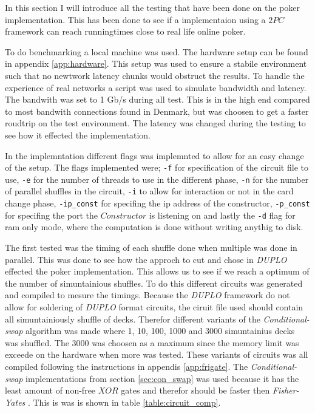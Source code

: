 \documentclass[twoside,11pt,openright]{report}
\newcommand{\FY}{\textit{Fisher-Yates} }
\newcommand{\CS}{\textit{Conditional-swap} }
\newcommand{\DUPLO}{\textit{DUPLO} }
\begin{document}
In this section I will introduce all the testing that have been done on the poker implementation. This has been done to see if a implementaion using a $2PC$ framework can reach runningtimes close to real life online poker.

To do benchmarking a local machine was used. The hardware setup can be found in appendix \ref{app:hardware}. This setup was used to ensure a stabile environment such that no newtwork latency chunks would obstruct the results. To handle the experience of real networks a script was used to simulate bandwidth and latency. The bandwith was set to 1 Gb/s during all test. This is in the high end compared to most bandwith connections found in Denmark, but was choosen to get a faster roudtrip on the test environment. The latency was changed during the testing to see how it effected the implementation.

In the implemntation different flags was implemnted to allow for an easy change of the setup. The flags implemented were; \verb|-f| for specification of the circuit file to use, \verb|-e| for the number of threads to use in the different phase, \verb|-n| for the number of parallel shuffles in the circuit, \verb|-i| to allow for interaction or not in the card change phase, \verb|-ip_const| for specifing the ip address of the constructor, \verb|-p_const| for specifing the port the $Constructor$ is listening on and lastly the \verb|-d| flag for ram only mode, where the computation is done without writing anythig to disk.

\bigskip

The first tested was the timing of each shuffle done when multiple was done in parallel. This was done to see how the approch to cut and chose in \DUPLO effected the poker implementation. This allows us to see if we reach a optimum of the number of simuntainious shuffles. To do this different circuits was generated and compiled to mesure the timings. Because the \DUPLO framework do not allow for soldering of \DUPLO format circuits, the ciruit file used should contain all simuntainiously shuffle of decks. Therefor different variants of the \CS algorithm was made where 1, 10, 100, 1000 and 3000 simuntainius decks was shuffled. The 3000 was choosen as a maximum since the memory limit was exceede on the hardware when more was tested. These variants of circuits was all compiled following the instructions in appendis \ref{app:frigate}. The \CS implementations from section \ref{sec:con_swap} was used because it has the least amount of non-free $XOR$ gates and therefor should be faster then \FY . This is was is shown in table \ref{table:circuit_comp}.
\end{document}
